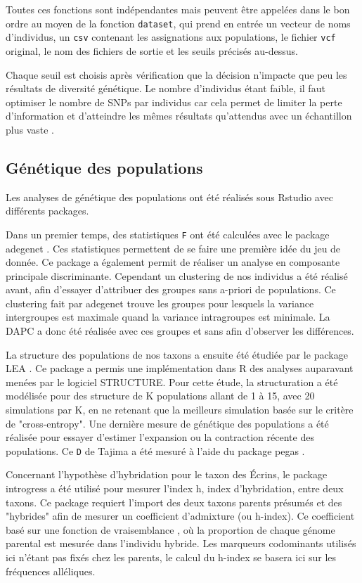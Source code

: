 Toutes ces fonctions sont indépendantes mais peuvent être appelées dans le bon ordre au moyen de la fonction \verb|dataset|, qui prend en entrée un vecteur de noms d'individus, un \verb|csv| contenant les assignations aux populations, le fichier \verb|vcf| original, le nom des fichiers de sortie et les seuils précisés au-dessus.

Chaque seuil est choisis après vérification que la décision n'impacte que peu les résultats de diversité génétique.
 Le nombre d'individus étant faible, il faut optimiser le nombre de SNPs par individus car cela permet de limiter la perte d'information et d'atteindre les mêmes résultats qu'attendus avec un échantillon plus vaste \citep{Nazareno2017}.


\subsection{Génétique des populations}

Les analyses de génétique des populations ont été réalisés sous Rstudio \citep{RTeam2017} avec différents packages. 

Dans un premier temps, des statistiques \verb|F| ont été calculées avec le package adegenet \citep{Jombart2011}. Ces statistiques permettent de se faire une première idée du jeu de donnée.
 Ce package a également permit de réaliser un analyse en composante principale discriminante.
 Cependant un clustering de nos individus a été réalisé avant, afin d'essayer d'attribuer des groupes sans a-priori de populations.
 Ce clustering fait par adegenet trouve les groupes pour lesquels la variance intergroupes est maximale quand la variance intragroupes est minimale.
 La DAPC a donc été réalisée avec ces groupes et sans afin d'observer les différences.

La structure des populations de nos taxons a ensuite été étudiée par le package LEA \citep{Frichot2015}.
 Ce package a permis une implémentation dans R des analyses auparavant menées par le logiciel STRUCTURE.
 Pour cette étude, la structuration a été modélisée pour des structure de K populations allant de 1 à 15, avec 20 simulations par K, en ne retenant que la meilleurs simulation basée sur le critère de "cross-entropy".
 Une dernière mesure de génétique des populations a été réalisée pour essayer d'estimer l’expansion ou la contraction récente des populations.
 Ce \verb|D| de Tajima a été mesuré à l'aide du package pegas \citep{Paradis2010}.

Concernant l'hypothèse d'hybridation pour le taxon des Écrins, le package introgress \citep{Gompert2010} a été utilisé pour mesurer l'index h, index d'hybridation, entre deux taxons.
 Ce package requiert l'import des deux taxons parents présumés et des "hybrides" afin de mesurer un coefficient d'admixture (ou h-index).
 Ce coefficient basé sur une fonction de vraisemblance \citep{Buerkle2005}, où la proportion de chaque génome parental est mesurée dans l'individu hybride.
 Les marqueurs codominants utilisés ici n'étant pas fixés chez les parents, le calcul du h-index se basera ici sur les fréquences alléliques.

